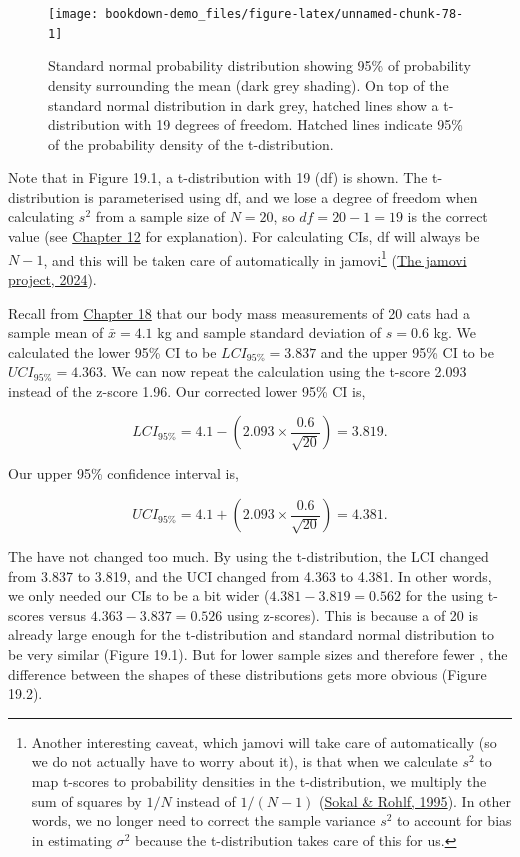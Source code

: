 \documentclass[
  openany]{krantz}
\begin{document}
\begin{figure}
\texttt{[image: bookdown-demo\_files/figure-latex/unnamed-chunk-78-1]} \caption{Standard normal probability distribution showing 95\% of probability density surrounding the mean (dark grey shading). On top of the standard normal distribution in dark grey, hatched lines show a t-distribution with 19 degrees of freedom. Hatched lines indicate 95\% of the probability density of the t-distribution.}\label{fig:unnamed-chunk-78}
\end{figure}

Note that in Figure 19.1, a t-distribution with 19  (df) is shown.
The t-distribution is parameterised using df, and we lose a degree of freedom when calculating \(s^{2}\) from a sample size of \(N = 20\), so \(df = 20 - 1 = 19\) is the correct value (see \protect\hyperlink{Chapter_12}{Chapter 12} for explanation).
For calculating CIs, df will always be \(N - 1\), and this will be taken care of automatically in jamovi\footnote{Another interesting caveat, which jamovi will take care of automatically (so we do not actually have to worry about it), is that when we calculate \(s^{2}\) to map t-scores to probability densities in the t-distribution, we multiply the sum of squares by \(1/N\) instead of \(1/(N-1)\) (\protect\hyperlink{ref-Sokal1995}{Sokal \& Rohlf, 1995}). In other words, we no longer need to correct the sample variance \(s^{2}\) to account for bias in estimating \(\sigma^{2}\) because the t-distribution takes care of this for us.} (\protect\hyperlink{ref-Jamovi2022}{The jamovi project, 2024}).

Recall from \protect\hyperlink{Chapter_18}{Chapter 18} that our body mass measurements of 20 cats had a sample mean of \(\bar{x} = 4.1\) kg and sample standard deviation of \(s = 0.6\) kg. We calculated the lower 95\% CI to be \(LCI_{95\%} = 3.837\) and the upper 95\% CI to be \(UCI_{95\%} = 4.363\). We can now repeat the calculation using the t-score 2.093 instead of the z-score 1.96.
Our corrected lower 95\% CI is,

\[LCI_{95\%} = 4.1 - \left(2.093 \times \frac{0.6}{\sqrt{20}}\right) = 3.819.\]

Our upper 95\% confidence interval is,

\[UCI_{95\%} = 4.1 + \left(2.093 \times \frac{0.6}{\sqrt{20}}\right) = 4.381.\]

The  have not changed too much.
By using the t-distribution, the LCI changed from 3.837 to 3.819, and the UCI changed from 4.363 to 4.381.
In other words, we only needed our CIs to be a bit wider (\(4.381 - 3.819 = 0.562\) for the using t-scores versus \(4.363 - 3.837 = 0.526\) using z-scores).
This is because a  of 20 is already large enough for the t-distribution and standard normal distribution to be very similar (Figure 19.1).
But for lower sample sizes and therefore fewer , the difference between the shapes of these distributions gets more obvious (Figure 19.2).
\end{document}
